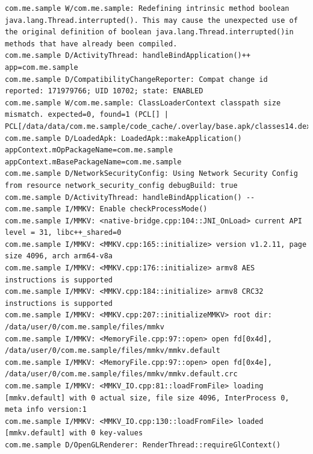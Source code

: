 \documentclass[9pt, b5paper]{article}
\begin{document}
\begin{verbatim}
com.me.sample W/com.me.sample: Redefining intrinsic method boolean java.lang.Thread.interrupted(). This may cause the unexpected use of the original definition of boolean java.lang.Thread.interrupted()in methods that have already been compiled.
com.me.sample D/ActivityThread: handleBindApplication()++ app=com.me.sample
com.me.sample D/CompatibilityChangeReporter: Compat change id reported: 171979766; UID 10702; state: ENABLED
com.me.sample W/com.me.sample: ClassLoaderContext classpath size mismatch. expected=0, found=1 (PCL[] | PCL[/data/data/com.me.sample/code_cache/.overlay/base.apk/classes14.dex*1294054685])
com.me.sample D/LoadedApk: LoadedApk::makeApplication() appContext.mOpPackageName=com.me.sample appContext.mBasePackageName=com.me.sample
com.me.sample D/NetworkSecurityConfig: Using Network Security Config from resource network_security_config debugBuild: true
com.me.sample D/ActivityThread: handleBindApplication() --
com.me.sample I/MMKV: Enable checkProcessMode()
com.me.sample I/MMKV: <native-bridge.cpp:104::JNI_OnLoad> current API level = 31, libc++_shared=0
com.me.sample I/MMKV: <MMKV.cpp:165::initialize> version v1.2.11, page size 4096, arch arm64-v8a
com.me.sample I/MMKV: <MMKV.cpp:176::initialize> armv8 AES instructions is supported
com.me.sample I/MMKV: <MMKV.cpp:184::initialize> armv8 CRC32 instructions is supported
com.me.sample I/MMKV: <MMKV.cpp:207::initializeMMKV> root dir: /data/user/0/com.me.sample/files/mmkv
com.me.sample I/MMKV: <MemoryFile.cpp:97::open> open fd[0x4d], /data/user/0/com.me.sample/files/mmkv/mmkv.default
com.me.sample I/MMKV: <MemoryFile.cpp:97::open> open fd[0x4e], /data/user/0/com.me.sample/files/mmkv/mmkv.default.crc
com.me.sample I/MMKV: <MMKV_IO.cpp:81::loadFromFile> loading [mmkv.default] with 0 actual size, file size 4096, InterProcess 0, meta info version:1
com.me.sample I/MMKV: <MMKV_IO.cpp:130::loadFromFile> loaded [mmkv.default] with 0 key-values
com.me.sample D/OpenGLRenderer: RenderThread::requireGlContext()


\end{verbatim}
\end{document}
